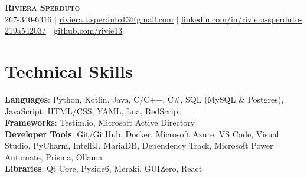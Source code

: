 \documentclass[letterpaper,11pt]{article}
\begin{document}

\begin{center}
    \textbf{\Huge \scshape Riviera Sperduto} \\ \vspace{1pt}
    \small 267-340-6316 $|$ \href{mailto:riviera.t.sperduto13@gmail.com}{\underline{riviera.t.sperduto13@gmail.com}} $|$
    \href{https://linkedin.com/in/riviera-sperduto-219a54203/}{\underline{linkedin.com/in/riviera-sperduto-219a54203/}} $|$
    \href{https://github.com/rivie13}{\underline{github.com/rivie13}}
\end{center}



%
\section{Technical Skills}
 \begin{itemize}[leftmargin=0.15in, label={}]
    \small{\item{
     \textbf{Languages}{: Python, Kotlin, Java, C/C++, C\#, SQL (MySQL \& Postgres), JavaScript, HTML/CSS, YAML, Lua, RedScript} \\
     \textbf{Frameworks}{: Testim.io, Microsoft Active Directory} \\
     \textbf{Developer Tools}{: Git/GitHub, Docker, Microsoft Azure, VS Code, Visual Studio, PyCharm, IntelliJ, MariaDB, Dependency Track, Microsoft Power Automate, Prisma, Ollama} \\
     \textbf{Libraries}{: Qt Core, Pyside6, Meraki, GUIZero, React}
    }}
 \end{itemize}
\end{document}
